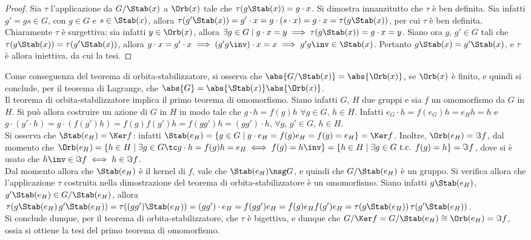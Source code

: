 \documentclass[11pt]{article}
\begin{document}
	\begin{proof}
		Sia $\tau$ l'applicazione da $G/\Stab(x)$ a $\Orb(x)$ tale
		che $\tau(g\Stab(x)) = g \cdot x$. Si dimostra innanzitutto che $\tau$ è
		ben definita. Sia infatti $g' = g s \in G$, con $g \in G$ e $s \in \Stab(x)$, allora $\tau(g' \Stab(x)) = g' \cdot x = g \cdot (s \cdot x) = g \cdot x = \tau(g \Stab(x))$, per cui $\tau$ è ben definita.  \\ 
		
		Chiaramente $\tau$ è surgettiva: sia infatti $y \in \Orb(x)$, allora
		$\exists g \in G \mid g \cdot x = y \implies \tau(g \Stab(x)) = g \cdot x = y$. Siano ora $g$, $g' \in G$ tali che $\tau(g \Stab(x)) = \tau(g' \Stab(x))$, allora $g \cdot x = g' \cdot x \implies (g' g\inv) \cdot x = x \implies g' g\inv \in \Stab(x)$. Pertanto $g \Stab(x) = g' \Stab(x)$, e $\tau$ è allora iniettiva, da cui la tesi.
	\end{proof}

	\begin{remark}\nl
		\li Come conseguenza del teorema di orbita-stabilizzatore,
		si osserva che $\abs{G/\Stab(x)} = \abs{\Orb(x)}$, se $\Orb(x)$ è
		finito, e quindi si conclude, per il teorema di Lagrange, che
		$\abs{G} = \abs{\Stab(x)} \abs{\Orb(x)}$. \\
		
		\li Il teorema di orbita-stabilizzatore implica il primo teorema di omomorfismo. Siano infatti
		$G$, $H$ due gruppi e sia $f$ un omomorfismo da $G$ in $H$. Si può allora costruire un azione
		di $G$ in $H$ in modo tale che $g \cdot h = f(g) h$ $\forall g \in G$, $h \in H$. Infatti
		$e_G \cdot h = f(e_G) h = e_H h = h$ e $g \cdot (g' \cdot h) = g \cdot (f(g') h) = f(g) f(g') h =
		f(g g') h = (g g') \cdot h$, $\forall g$, $g' \in G$, $h \in H$. \\
		
		Si osserva che $\Stab(e_H) = \Ker f$:
		infatti $\Stab(e_H) = \{ g \in G \mid g \cdot e_H = f(g) e_H = f(g) = e_H \} = \Ker f$. Inoltre,
		$\Orb(e_H) = \Im f$, dal momento che $\Orb(e_H) = \{ h \in H \mid \exists g \in G \tc g \cdot h = f(g) h = e_H \iff f(g) = h\inv \} = \{ h \in H \mid \exists g \in G \text{ t.c. } f(g) = h \} = \Im f$, dove
		si è usato che $h\inv \in \Im f \iff h \in \Im f$. \\
		
		Dal momento allora che $\Stab(e_H)$ è il kernel di $f$, vale che $\Stab(e_H) \nsg G$, e quindi
		che $G/\Stab(e_H)$ è un gruppo.
		Si verifica allora che l'applicazione $\tau$ costruita nella dimostrazione del teorema di orbita-stabilizzatore
		è un omomorfismo. Siano infatti $g \Stab(e_H)$, $g' \Stab(e_H) \in G/\Stab(e_H)$, allora
		$\tau(g \Stab(e_H) \, g' \Stab(e_H)) = \tau((g g') \Stab(e_H)) = (g g') \cdot e_H = f(g g') e_H =
		f(g) e_H f(g') e_H = \tau(g \Stab(e_H)) \, \tau(g' \Stab(e_H))$. \\
		
		Si conclude dunque, per il teorema di orbita-stabilizzatore, che $\tau$ è bigettiva, e dunque
		che $G/\Ker f = G/\Stab(e_H) \cong \Orb(e_H) = \Im f$, ossia si ottiene la tesi del primo
		teorema di omomorfismo.
	\end{remark}
\end{document}
